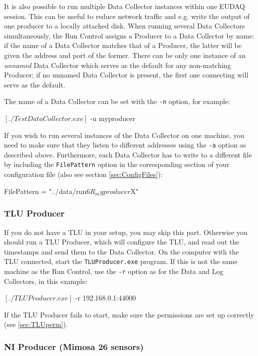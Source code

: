 It is also possible to run multiple Data Collector instances within
one EUDAQ session. 
This can be useful to reduce network traffic and
e.g. write the output of one producer to a locally attached disk. 
When running several Data Collectors simultaneously, the Run Control assigns a
Producer to a Data Collector by name: if the name of a Data Collector
matches that of a Producer, the latter will be given the address and
port of the former. 
There can be only one instance of an \emph{unnamed} Data
Collector which serves as the default for any non-matching Producer;
if no unnamed Data Collector is present, the first one connecting will
serve as the default.

The name of a Data Collector can be set with the
\texttt{-n} option, for example:
\begin{listing}[mybash]
$[./TestDataCollector.exe]$ -n myproducer
\end{listing}

If you wish to run several instances of the Data Collector on one
machine, you need to make sure that they listen to different addresses
using the \texttt{-a} option as described above. 
Furthermore, each Data Collector has to write to a different file by including the
\texttt{FilePattern} option in the corresponding section of your
configuration file (also see section \ref{sec:ConfigFiles}):

\begin{listing}
FilePattern = "../data/run$6R_myproducer$X"
\end{listing}

\subsubsection{TLU Producer}
If you do not have a \gls{TLU} in your setup, you may skip this part.
Otherwise you should run a TLU Producer, which will configure the \gls{TLU},
and read out the timestamps and send them to the Data Collector.
On the computer with the \gls{TLU} connected, start the \texttt{TLUProducer.exe} program.
If this is not the same machine as the Run Control,
use the \texttt{-r} option as for the Data and Log Collectors, in this example:
\begin{listing}[mybash]
$[./TLUProducer.exe]$ -r 192.168.0.1:44000
\end{listing}
If the TLU Producer fails to start, make sure the permissions are set up correctly (see \autoref{sec:TLUperm}).

\subsubsection{NI Producer (Mimosa 26 sensors)}

